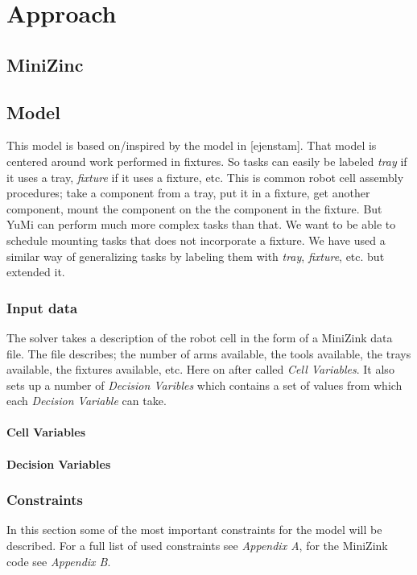 \chapter{Approach}

\section{MiniZinc}
\section{Model}
This model is based on/inspired by the model in [ejenstam]. That model is centered around work performed in fixtures. So tasks can easily be labeled \emph{tray} if it uses a tray, \emph{fixture} if it uses a fixture, etc. This is common robot cell assembly procedures; take a component from a tray, put it in a fixture, get another component, mount the component on the the component in the fixture. But YuMi can perform much more complex tasks than that. We want to be able to schedule mounting tasks that does not incorporate a fixture. We have used a similar way of generalizing tasks by labeling them with \emph{tray}, \emph{fixture}, etc. but extended it.
\subsection{Input data}
The solver takes a description of the robot cell in the form of a MiniZink data file. The file describes; the number of arms available, the tools available, the trays available, the fixtures available, etc. Here on after called \emph{Cell Variables}. It also sets up a number of \emph{Decision Varibles} which contains a set of values from which each \emph{Decision Variable} can take.
\subsubsection{Cell Variables}


\subsubsection{Decision Variables}


\subsection{Constraints}
In this section some of the most important constraints for the model will be described. For a full list of used constraints see \emph{Appendix A}, for the MiniZink code see \emph{Appendix B}.


